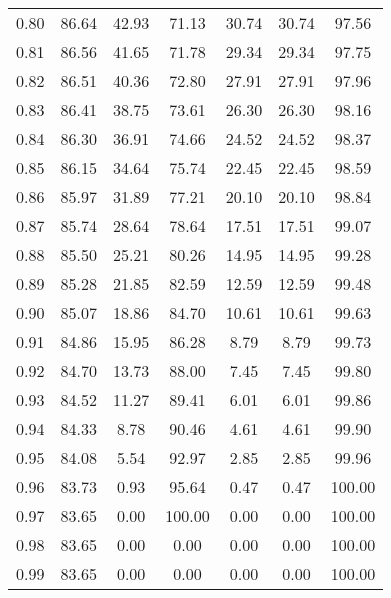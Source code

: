 \begin{tabular}{|c|c|c|c|c|c|c|}
      0.80 &     86.64 &     42.93 &      71.13 &   30.74 &      30.74 &         97.56 \\
      0.81 &     86.56 &     41.65 &      71.78 &   29.34 &      29.34 &         97.75 \\
      0.82 &     86.51 &     40.36 &      72.80 &   27.91 &      27.91 &         97.96 \\
      0.83 &     86.41 &     38.75 &      73.61 &   26.30 &      26.30 &         98.16 \\
      0.84 &     86.30 &     36.91 &      74.66 &   24.52 &      24.52 &         98.37 \\
      0.85 &     86.15 &     34.64 &      75.74 &   22.45 &      22.45 &         98.59 \\
      0.86 &     85.97 &     31.89 &      77.21 &   20.10 &      20.10 &         98.84 \\
      0.87 &     85.74 &     28.64 &      78.64 &   17.51 &      17.51 &         99.07 \\
      0.88 &     85.50 &     25.21 &      80.26 &   14.95 &      14.95 &         99.28 \\
      0.89 &     85.28 &     21.85 &      82.59 &   12.59 &      12.59 &         99.48 \\
      0.90 &     85.07 &     18.86 &      84.70 &   10.61 &      10.61 &         99.63 \\
      0.91 &     84.86 &     15.95 &      86.28 &    8.79 &       8.79 &         99.73 \\
      0.92 &     84.70 &     13.73 &      88.00 &    7.45 &       7.45 &         99.80 \\
      0.93 &     84.52 &     11.27 &      89.41 &    6.01 &       6.01 &         99.86 \\
      0.94 &     84.33 &      8.78 &      90.46 &    4.61 &       4.61 &         99.90 \\
      0.95 &     84.08 &      5.54 &      92.97 &    2.85 &       2.85 &         99.96 \\
      0.96 &     83.73 &      0.93 &      95.64 &    0.47 &       0.47 &        100.00 \\
      0.97 &     83.65 &      0.00 &     100.00 &    0.00 &       0.00 &        100.00 \\
      0.98 &     83.65 &      0.00 &       0.00 &    0.00 &       0.00 &        100.00 \\
      0.99 &     83.65 &      0.00 &       0.00 &    0.00 &       0.00 &        100.00 \\
\bottomrule
\end{tabular}
